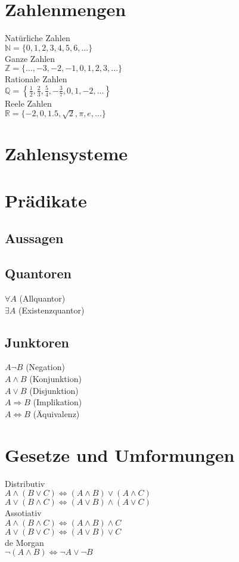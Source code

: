 \section{Zahlenmengen}
Natürliche Zahlen\\
\(\mathbb{N} = \{0,1,2,3,4,5,6,...\}\) \\
Ganze Zahlen\\
\(\mathbb{Z} = \{...,-3,-2,-1,0,1,2,3,...\}\) \\
Rationale Zahlen\\
\(\mathbb{Q} = \left\{ \frac{1}{2}, \frac{2}{3}, \frac{5}{4}, -\frac{3}{7}, 0, 1, -2, ... \right\}\) \\
Reele Zahlen\\
\(\mathbb{R} = \{ -2, 0, 1.5, \sqrt{2}, \pi, e, ... \}\)

\section{Zahlensysteme}

\section{Prädikate}
\subsection{Aussagen}
\subsection{Quantoren}
\(\forall A\) (Allquantor)\\
\(\exists A\) (Existenzquantor)
\subsection{Junktoren}
\(A \neg B\) (Negation)\\
\(A \wedge B\) (Konjunktion)\\
\(A \vee B\) (Disjunktion)\\
\(A \Rightarrow B\) (Implikation)\\
\(A \Leftrightarrow B\) (Äquivalenz)

\section{Gesetze und Umformungen}
Distributiv\\
\(A \wedge (B \vee C) \Leftrightarrow (A \wedge B) \vee (A \wedge C)\)\\
\(A \vee (B \wedge C) \Leftrightarrow (A \vee B) \wedge (A \vee C)\)\\

Assotiativ\\
\(A \wedge (B \wedge C) \Leftrightarrow (A \wedge B) \wedge C\)\\
\(A \vee (B \vee C) \Leftrightarrow (A \vee B) \vee C\)\\

de Morgan\\
\(\neg (A \wedge B) \Leftrightarrow \neg A \vee \neg B\)\\